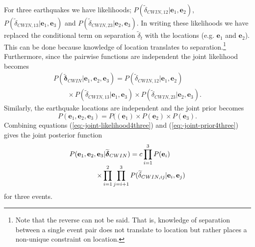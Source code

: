 \documentclass[extra, onecolumn, doublespacing]{gji}
\begin{document}
For three earthquakes we have likelihoods;
$P(\widetilde{\delta}_{CWIN,12}|\mathbf{e}_1, \mathbf{e}_2)$,
$P(\widetilde{\delta}_{CWIN,13}|\mathbf{e}_1, \mathbf{e}_3)$
and
$P(\widetilde{\delta}_{CWIN,23}|\mathbf{e}_2, \mathbf{e}_3)$.
In writing
these likelihoods we have replaced the conditional term on separation
$\widetilde{\delta}_t$ with the locations (e.g. $\mathbf{e}_1$ and $\mathbf{e}_2$).
This can be done because
knowledge of location translates to separation.\footnote{Note that the reverse
can not be said. That is, knowledge of separation between a single event pair
does not translate to location but rather places a non-unique constraint on
location.}
Furthermore, since the pairwise functions are independent the joint
likelihood becomes
\begin{equation}
\begin{array}{l}
\label{eq:-joint-likelihood4three}
P(\widetilde{\mathbf{\delta}}_{CWIN} | \mathbf{e}_1, \mathbf{e}_2, \mathbf{e}_3) =
P(\widetilde{\delta}_{CWIN,12} | \mathbf{e}_1, \mathbf{e}_2) \\
\hspace{2em} \times P(\widetilde{\delta}_{CWIN,13} | \mathbf{e}_1, \mathbf{e}_3)
\times  P(\widetilde{\delta}_{CWIN,23} | \mathbf{e}_2, \mathbf{e}_3).
\end{array}
\end{equation}
Similarly, the earthquake locations are independent and the
joint prior becomes
\begin{equation}
\label{eq:-joint-prior4three}
P(\mathbf{e}_1, \mathbf{e}_2, \mathbf{e}_3) = P((\mathbf{e}_1) \times P(\mathbf{e}_2) \times P(\mathbf{e}_3).
\end{equation}
Combining equations (\ref{eq:-joint-likelihood4three}) and
(\ref{eq:-joint-prior4three}) gives the joint posterior function
\begin{equation}
\label{eq-3eqposterior}
\begin{array}{l}
P(\mathbf{e}_1, \mathbf{e}_2, \mathbf{e}_3 | \widetilde{\mitbf{\delta}}_{CWIN}) = c \displaystyle \prod_{i=1}^3 P(\mathbf{e}_i) \\
\hspace{4em}  \times \displaystyle \prod_{i=1}^2 \prod_{j=i+1}^3 P(\widetilde{\delta}_{CWIN,ij}|\mathbf{e}_i,\mathbf{e}_j)
\end{array}
\end{equation}
for three events.
\end{document}
